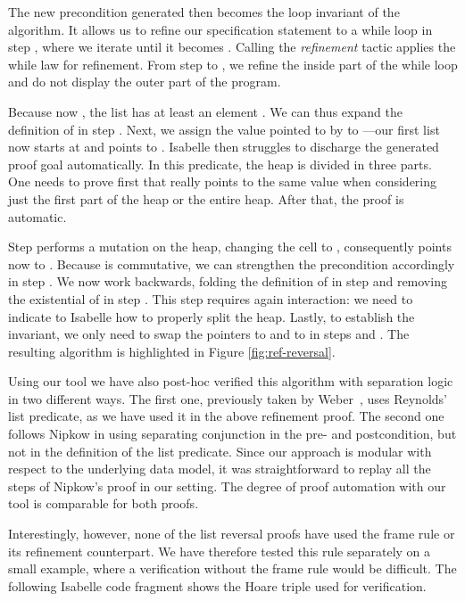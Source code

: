 \documentclass[twoside,runningheads,envcountsame,envcountsect,oribibl,orivec]{llncs}
\begin{document}
The new precondition generated then becomes the loop invariant of the
algorithm. It allows us to refine our specification statement to a
while loop in step , where we iterate  until it becomes .
Calling the \emph{refinement} tactic applies the while law for
refinement.  From step  to , we refine the inside part of
the while loop and do not display the outer part of the program.

Because now , the list  has at least an element . We
can thus expand the definition of  in step . Next, we
assign the value pointed to by  to ---our first list now
starts at  and  points to .  Isabelle then struggles
to discharge the generated proof goal automatically.  In this
predicate, the heap is divided in three parts. One needs to prove
first that  really points to the same value when considering
just the first part of the heap or the entire heap. After that, the
proof is automatic.

Step  performs a mutation on the heap, changing the cell 
to , consequently  points now to .  Because  is
commutative, we can strengthen the precondition accordingly in step
.  We now work backwards, folding the definition of  in
step  and removing the existential of  in step . This
step requires again interaction: we need to indicate to Isabelle how
to properly split the heap.  Lastly, to establish the invariant, we
only need to swap the pointers  to  and  to  in steps
 and . The resulting algorithm is highlighted in Figure
\ref{fig:ref-reversal}.



Using our tool we have also post-hoc verified this algorithm with
separation logic in two different ways. The first one, previously
taken by Weber~\cite{Weber04}, uses Reynolds' list predicate, as we
have used it in the above refinement proof. The second one follows
Nipkow in using separating conjunction in the pre- and postcondition,
but not in the definition of the list predicate. Since our approach is
modular with respect to the underlying data model, it was
straightforward to replay all the steps of Nipkow's proof in our
setting.  The degree of proof automation with our tool is comparable
for both proofs.

Interestingly, however, none of the list reversal proofs have used the
frame rule or its refinement counterpart. We have therefore tested
this rule separately on a small example, where a verification without
the frame rule would be difficult. The following Isabelle code fragment
shows the Hoare triple used for verification.
\end{document}
